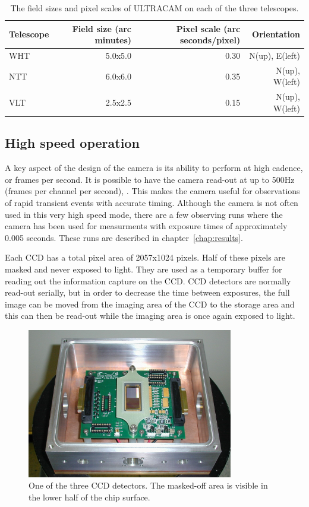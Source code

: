 \begin{table}[h]
	\begin{tabular}{|l|r|r|r|}
    	\hline
		Telescope & Field size (arc minutes) & Pixel scale (arc seconds/pixel) & Orientation \\
		\hline
		WHT & 5.0x5.0 & 0.30 & N(up), E(left)\\
		NTT & 6.0x6.0 & 0.35 & N(up), W(left)\\
		VLT & 2.5x2.5 & 0.15 & N(up), W(left)\\
		\hline
	\end{tabular}
	\caption{The field sizes and pixel scales of ULTRACAM on each of the three telescopes.}
	\label{tab:pixelscale}
\end{table}

\subsection{High speed operation}
A key aspect of the design of the camera is its ability to perform at high cadence, or frames per second. It is possible to have the camera read-out at up to 500Hz (frames per channel per second), \citep{dhillon07}. This makes the camera useful for observations of rapid transient events with accurate timing. Although the camera is not often used in this very high speed mode, there are a few observing runs where the camera has been used for measurments with exposure times of approximately 0.005 seconds. These runs are described in chapter~\ref{chap:results}.

Each CCD has a total pixel area of 2057x1024 pixels. Half of these pixels are masked and never exposed to light. They are used as a temporary buffer for reading out the information capture on the CCD. CCD detectors are normally read-out serially, but in order to decrease the time between exposures, the full image can be moved from the imaging area of the CCD to the storage area and this can then be read-out while the imaging area is once again exposed to light. 

\begin{figure}
\centering
\includegraphics[width=90mm]{images/ccd.png}
\caption{One of the three CCD detectors. The masked-off area is visible in the lower half of the chip surface.}
\label{fig2}
\end{figure}


